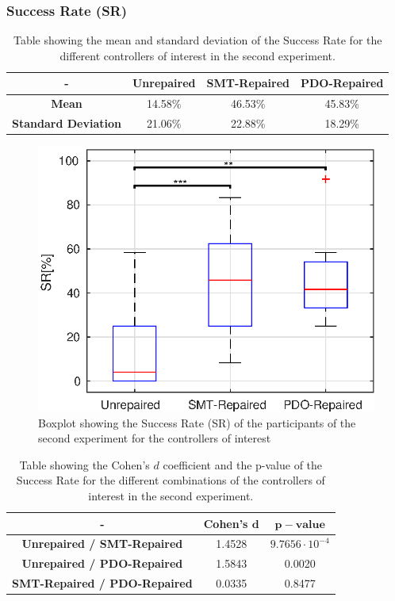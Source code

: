 \subsubsection{Success Rate (SR)}\label{subsub:second-SR}
\begin{table}[H]
    \centering
    \begin{tabular}{|c|c|c|c|}
        \hline
        - & \textbf{Unrepaired} & \textbf{SMT-Repaired} & \textbf{PDO-Repaired} \\
        \hline
        \textbf{Mean} & 14.58\% & 46.53\% & 45.83\% \\
        \textbf{Standard Deviation} & 21.06\% & 22.88\% & 18.29\% \\
        \hline
    \end{tabular}
    \caption{Table showing the mean and standard deviation of the Success Rate for the different controllers of interest in the second experiment.}
    \label{tab:SR-second-mean-std}
\end{table}
\begin{figure}[H]
    \centering
    \includegraphics[width=\textwidth]{Images/second-experiment/exp1_success_rate}
    \caption{Boxplot showing the Success Rate (SR) of the participants of the second experiment for the controllers of interest}
    \label{fig:box-SR-second}
\end{figure}
\begin{table}[H]
    \centering
    \begin{tabular}{|c|c|c|}
        \hline
        - & \textbf{Cohen's} $\mathbf{d}$ & $\mathbf{p-value}$ \\
        \hline
        \textbf{Unrepaired / SMT-Repaired} & 1.4528 & $9.7656 \cdot 10^{-4}$ \\
        \textbf{Unrepaired / PDO-Repaired} & 1.5843 & 0.0020 \\
        \textbf{SMT-Repaired / PDO-Repaired} & 0.0335 & 0.8477 \\
        \hline
    \end{tabular}
    \caption{Table showing the Cohen's $d$ coefficient and the p-value of the Success Rate for the different combinations of the controllers of interest in the second experiment.}
    \label{tab:SR-second-cohen-p}
\end{table}
